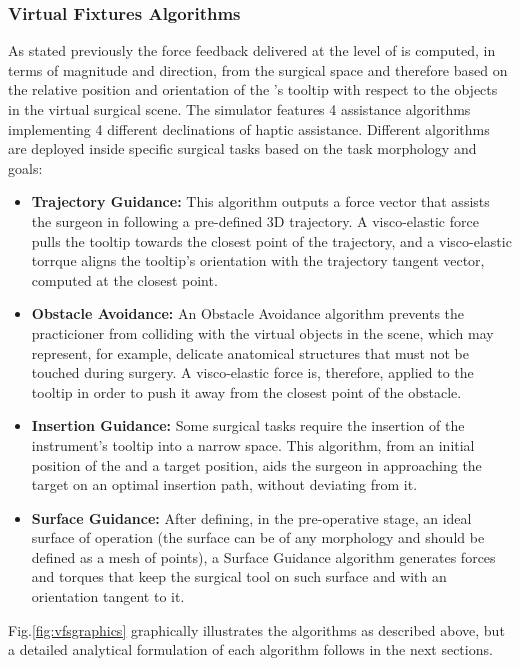\documentclass[../main.tex]{subfiles}
\begin{document}
\subsubsection{Virtual Fixtures Algorithms}
As stated previously the force feedback delivered at the level of \mtm is computed, in terms of magnitude and direction, from the surgical space and therefore based on the relative position and orientation of the \psm's tooltip with respect to the objects in the virtual surgical scene. The simulator features 4 assistance algorithms implementing 4 different declinations of haptic assistance. Different algorithms are deployed inside specific surgical tasks based on the task morphology and goals:
\begin{itemize}
  \item \textbf{Trajectory Guidance:} This algorithm outputs a force vector that assists the surgeon in following a pre-defined 3D trajectory. A visco-elastic force pulls the \ee tooltip towards the closest point of the trajectory, and a visco-elastic torrque aligns the tooltip's orientation with the trajectory tangent vector, computed at the closest point.
  \item \textbf{Obstacle Avoidance:} An Obstacle Avoidance algorithm prevents the practicioner from colliding with the virtual objects in the scene, which may represent, for example, delicate anatomical structures that must not be touched during surgery. A visco-elastic force is, therefore, applied to the \ee tooltip in order to push it away from the closest point of the obstacle.
  \item \textbf{Insertion Guidance:} Some surgical tasks require the insertion of the instrument's tooltip into a narrow space. This algorithm, from an initial position of the \psm and a target position, aids the surgeon in approaching the target on an optimal insertion path, without deviating from it.
  \item \textbf{Surface Guidance:} After defining, in the pre-operative stage, an ideal surface of operation (the surface can be of any morphology and should be defined as a mesh of points), a Surface Guidance algorithm generates forces and torques that keep the surgical tool on such surface and with an orientation tangent to it. 
\end{itemize} 

Fig.\ref{fig:vfsgraphics} graphically illustrates the \vf algorithms as described above, but a detailed analytical formulation of each algorithm follows in the next sections.
\end{document}
